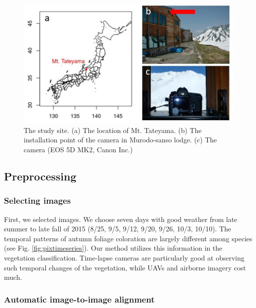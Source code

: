 \documentclass{article}
\begin{document}
\begin{figure}
\includegraphics[width=1\linewidth]{paper_files/figures/Slide3} \caption{The study site. (a) The location of Mt. Tateyama. (b) The installation point of the camera in Murodo-sanso lodge. (c) The camera (EOS 5D MK2, Canon Inc.)}\label{fig:map}
\end{figure}

\hypertarget{preprocessing}{%
\subsection{Preprocessing}\label{preprocessing}}

\hypertarget{selecting-images}{%
\subsubsection{Selecting images}\label{selecting-images}}

First, we selected images. We choose seven days with good weather from late summer to late fall of 2015 (8/25, 9/5, 9/12, 9/20, 9/26, 10/3, 10/10). The temporal patterns of autumn foliage coloration are largely different among species (see Fig. \ref{fig:pixtimeseries}). Our method utilizes this information in the vegetation classification. Time-lapse cameras are particularly good at observing such temporal changes of the vegetation, while UAVs and airborne imagery cost much.

\hypertarget{automatic-image-to-image-alignment}{%
\subsubsection{Automatic image-to-image alignment}\label{automatic-image-to-image-alignment}}
\end{document}
